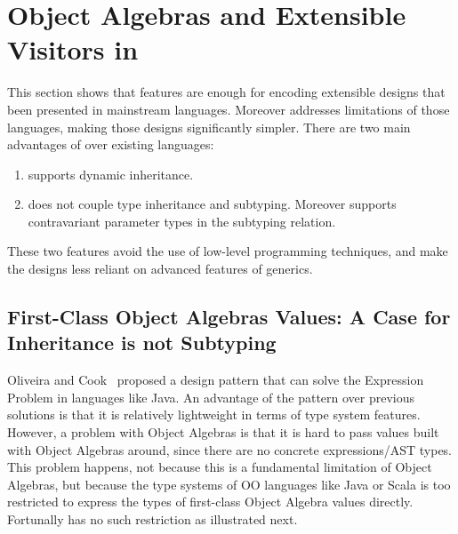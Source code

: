 \section{Object Algebras and Extensible Visitors in \name}

This section shows that \name features are enough for encoding extensible designs that
been presented in mainstream languages. Moreover \name addresses
limitations of those languages, making those designs
significantly simpler. There are two main advantages of \name
over existing languages:
\begin{enumerate}
\item \name supports dynamic inheritance.
\item \name does not couple type inheritance and subtyping. Moreover
\name supports contravariant parameter types in the subtyping
relation.
\end{enumerate}

These two features avoid the use of low-level programming
techniques, and make the designs less reliant on advanced
features of generics.

\subsection{First-Class Object Algebras Values: A Case for Inheritance
is not Subtyping}

Oliveira and Cook~\cite{} proposed a design pattern that can
solve the Expression Problem in languages like Java. An
advantage of the pattern over previous solutions is that it is
relatively lightweight in terms of type system features. However, 
a problem with Object Algebras is that it is hard to pass 
values built with Object Algebras around, since there are 
no concrete expressions/AST types. This problem happens, not 
because this is a fundamental limitation of Object Algebras, but 
because the type systems of OO languages like Java or Scala 
is too restricted to express the types of first-class Object Algebra
values directly. Fortunally \name has no such restriction as
illustrated next. 

